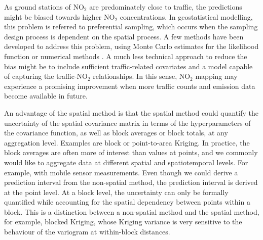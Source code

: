 \documentclass{article}
\begin{document}
As ground stations of NO$_2$ are predominately close to traffic, the predictions might be biased towards higher NO$_2$ concentrations. In geostatistical modelling, this problem is referred to preferential sampling, which occurs when the sampling design process is dependent on the spatial process. A few methods have been developed to address this problem, using Monte Carlo estimates for the likelihood function \citep{diggle2010geostatistical} or numerical methods \citep{dinsdale2019methods}. %
A much less technical approach to reduce the bias might be to include sufficient traffic-related covariates and a model capable of capturing the traffic-NO$_2$ relationships. In this sense, NO$_2$ mapping may experience a promising improvement when more traffic counts and emission data become available in future.  

An advantage of the spatial method is that the spatial method could quantify the uncertainty of the spatial covariance matrix in terms of the hyperparameters of the covariance function, as well as block averages or block totals, at any aggregation level. Examples are block or point-to-area Kriging. In practice, the block averages are often more of interest than values at points, and we commonly would like to aggregate data at different spatial and spatiotemporal levels. For example, with mobile sensor measurements. Even though we could derive a prediction interval from the non-spatial method, the prediction interval is derived at the point level. At a block level, the uncertainty can only be formally quantified while accounting for the spatial dependency between points within a block. This is a distinction between a non-spatial method and the spatial method, for example, blocked Kriging, whose Kriging variance is very sensitive to the behaviour of the variogram at within-block distances. 
\end{document}
